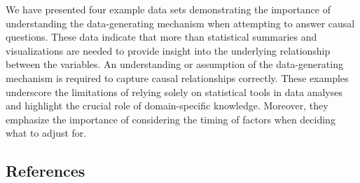 \documentclass[
  letterpaper,
  DIV=11,
  numbers=noendperiod]{scrartcl}
\begin{document}
We have presented four example data sets demonstrating the importance of
understanding the data-generating mechanism when attempting to answer
causal questions. These data indicate that more than statistical
summaries and visualizations are needed to provide insight into the
underlying relationship between the variables. An understanding or
assumption of the data-generating mechanism is required to capture
causal relationships correctly. These examples underscore the
limitations of relying solely on statistical tools in data analyses and
highlight the crucial role of domain-specific knowledge. Moreover, they
emphasize the importance of considering the timing of factors when
deciding what to adjust for.

\hypertarget{references}{%
\subsection{References}\label{references}}
\end{document}
